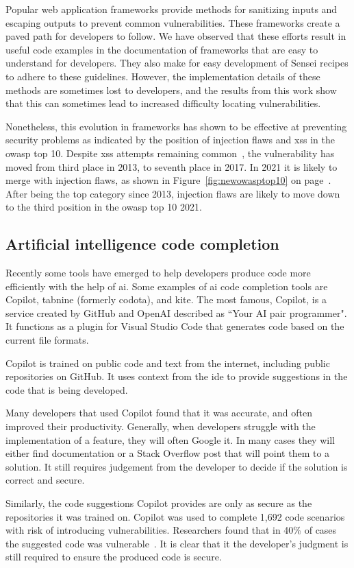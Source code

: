 Popular web application frameworks provide methods for sanitizing inputs and escaping outputs to prevent common vulnerabilities.
These frameworks create a paved path for developers to follow.
We have observed that these efforts result in useful code examples in the documentation of frameworks that are easy to understand for developers.
They also make for easy development of Sensei recipes to adhere to these guidelines.
However, the implementation details of these methods are sometimes lost to developers, and the results from this work show that this can sometimes lead to increased difficulty locating vulnerabilities.

Nonetheless, this evolution in frameworks has shown to be effective at preventing security problems as indicated by the position of injection flaws and \gls{xss} in the \gls{owasp} top 10.
Despite \gls{xss} attempts remaining common~\cite{trustwave}, the vulnerability has moved from third place in 2013, to seventh place in 2017.
In 2021 it is likely to merge with injection flaws, as shown in Figure~\ref{fig:newowasptop10} on page~\pageref{fig:newowasptop10}.
After being the top category since 2013, injection flaws are likely to move down to the third position in the \gls{owasp} top 10 2021.

\subsection{Artificial intelligence code completion}
Recently some tools have emerged to help developers produce code more efficiently with the help of \gls{ai}.
Some examples of \gls{ai} code completion tools are Copilot, tabnine (formerly codota), and  kite.
The most famous, Copilot, is a service created by GitHub and OpenAI described as ``Your AI pair programmer".
It functions as a plugin for Visual Studio Code that generates code based on the current file formats.

Copilot is trained on public code and text from the internet, including public repositories on GitHub.
It uses context from the \gls{ide} to provide suggestions in the code that is being developed.

Many developers that used Copilot found that it was accurate, and often improved their productivity.
Generally, when developers struggle with the implementation of a feature, they will often Google it.
In many cases they will either find documentation or a Stack Overflow post that will point them to a solution.
It still requires judgement from the developer to decide if the solution is correct and secure.

Similarly, the code suggestions Copilot provides are only as secure as the repositories it was trained on.
Copilot was used to complete 1,692 code scenarios with risk of introducing vulnerabilities.
Researchers found that in 40\% of cases the suggested code was vulnerable~\cite{copilot2021}.
It is clear that it the developer's judgment is still required to ensure the produced code is secure.